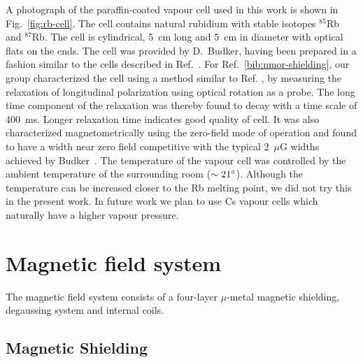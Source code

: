 A photograph of the paraffin-coated vapour cell used in this work is
shown in Fig.~\ref{fig:rb-cell}.  The cell contains natural rubidium
with stable isotopes $^{85}$Rb and $^{87}$Rb.  The cell is
cylindrical, 5~cm long and 5~cm in diameter with optical flats on the
ends.  The cell was provided by D.~Budker, having been prepared in a
fashion similar to the cells described in
Ref.~\cite{PhysRevA.72.023401}.  For Ref.~\ref{bib:nmor-shielding},
our group characterized the cell using a method similar to
Ref. \cite{PhysRevA.72.023401}, by measuring the relaxation of
longitudinal polarization using optical rotation as a probe.  The long
time component of the relaxation was thereby found to decay with a
time scale of 400~ms.  Longer relaxation time indicates good quality
of cell.  It was also characterized magnetometrically using the
zero-field mode of operation and found to have a width near zero field
competitive with the typical 2~$\mu$G widths achieved by
Budker~\cite{bib:UltranarrowWidths}.  The temperature of the
vapour cell was controlled by the ambient temperature of the
surrounding room ($\sim 21\degree$).  Although the temperature can be
increased closer to the Rb melting point, we did not try this in the
present work.  In future work we plan to use Cs vapour cells which
naturally have a higher vapour pressure.

\section{Magnetic field system}

The magnetic field system consists of a four-layer $\mu$-metal
magnetic shielding, degaussing system and internal coils.

\subsection{Magnetic Shielding}

